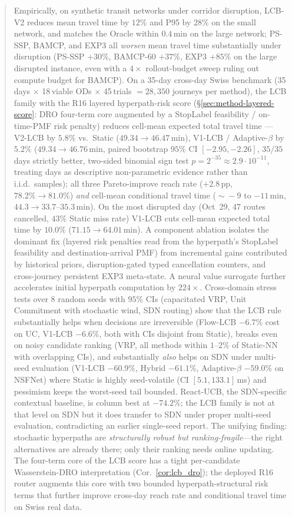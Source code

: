 \documentclass[11pt]{article}
\theoremstyle{definition}
\theoremstyle{remark}
\begin{document}
\begin{abstract}
Empirically, on synthetic transit networks under corridor disruption,
LCB-V2 reduces mean travel time by $12\%$ and P95 by $28\%$ on the
small network, and matches the Oracle within $0.4$\,min on the
large network; PS-SSP, BAMCP, and EXP3 all \emph{worsen} mean
travel time substantially under disruption (PS-SSP $+30\%$,
BAMCP-60 $+37\%$, EXP3 $+85\%$ on the large disrupted instance,
even with a $4{\times}$ rollout-budget sweep ruling out compute
budget for BAMCP). On a 35-day
cross-day Swiss benchmark (35\,days $\times$ 18\,viable ODs
$\times$ 45\,trials $=28{,}350$ journeys per method), the LCB
family with the R16 layered hyperpath-risk score
(\S\ref{sec:method-layered-score}: DRO four-term core augmented by a
StopLabel feasibility / on-time-PMF risk penalty) reduces
cell-mean expected total travel time --- V2-LCB by $5.8\%$ vs.\
Static ($49.34\!\to\!46.47$\,min), V1-LCB / Adaptive-$\beta$ by
$5.2\%$ ($49.34\!\to\!46.76$\,min, paired bootstrap $95\%$ CI
$[-2.95, -2.26]$, $35/35$ days strictly better, two-sided binomial
sign test $p\!=\!2^{-35}\!\approx\!2.9\!\cdot\!10^{-11}$, treating
days as descriptive non-parametric evidence rather than i.i.d.\
samples); all three Pareto-improve reach rate ($+2.8$\,pp,
$78.2\%\!\to\!81.0\%$) \emph{and} cell-mean conditional travel time
($\!\sim\!-9$ to $-11$\,min, $44.3\!\to\!33.7$--$35.3$\,min).
On the most disrupted day (Oct~29, 47 routes cancelled, $43\%$
Static miss rate) V1-LCB cuts cell-mean expected total time by
$10.0\%$ ($71.15\!\to\!64.01$\,min). A
component ablation isolates the dominant fix (layered risk penalties
read from the hyperpath's StopLabel feasibility and destination-arrival
PMF) from incremental gains contributed by historical priors,
disruption-gated typed cancellation counters, and cross-journey
persistent EXP3 meta-state. A neural value surrogate further accelerates initial hyperpath
computation by $224\times$. Cross-domain stress tests over $8$
random seeds with $95\%$ CIs (capacitated VRP, Unit Commitment
with stochastic wind, SDN routing) show that the LCB rule
substantially helps when decisions are irreversible (Flow-LCB
$-6.7\%$ cost on UC, V1-LCB $-6.6\%$, both with CIs disjoint from
Static), breaks even on noisy candidate ranking (VRP, all methods
within $1$--$2\%$ of Static-NN with overlapping CIs), and
substantially \emph{also} helps on SDN under multi-seed evaluation
(V1-LCB $-60.9\%$, Hybrid $-61.1\%$, Adaptive-$\beta$ $-59.0\%$
on NSFNet) where Static is highly seed-volatile (CI
$[5.1, 133.1]$\,ms) and pessimism keeps the worst-seed tail
bounded. React-UCB, the SDN-specific contextual baseline, is
column best at $-74.2\%$; the LCB family is not at that level on
SDN but it does transfer to SDN under proper multi-seed evaluation,
contradicting an earlier single-seed report. The
unifying finding: stochastic hyperpaths are \emph{structurally
robust but ranking-fragile}---the right alternatives are already
there; only their ranking needs online updating. The four-term core
of the LCB score has a tight per-candidate Wasserstein-DRO
interpretation (Cor.~\ref{cor:lcb_dro}); the deployed R16 router
augments this core with two bounded hyperpath-structural risk
terms that further improve cross-day reach rate and conditional
travel time on Swiss real data.
\end{abstract}
\end{document}
